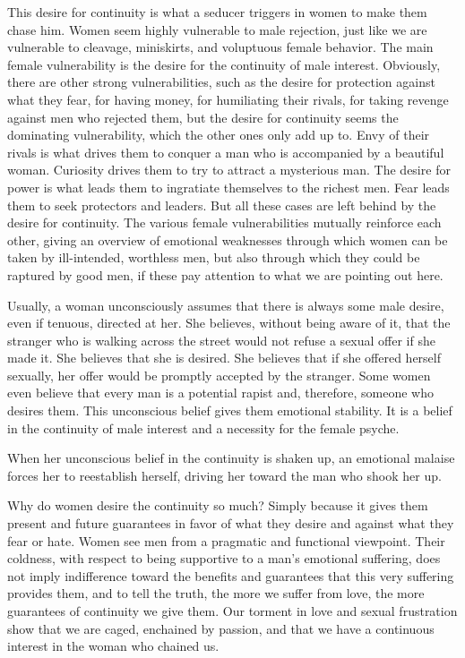 \par This desire for continuity is what a seducer triggers in women to make them chase him. Women seem highly vulnerable to male rejection, just like we are vulnerable to cleavage, miniskirts, and voluptuous female behavior. The main female vulnerability is the desire for the continuity of male interest. Obviously, there are other strong vulnerabilities, such as the desire for protection against what they fear, for having money, for humiliating their rivals, for taking revenge against men who rejected them, but the desire for continuity seems the dominating vulnerability, which the other ones only add up to. Envy of their rivals is what drives them to conquer a man who is accompanied by a beautiful woman. Curiosity drives them to try to attract a mysterious man. The desire for power is what leads them to ingratiate themselves to the richest men. Fear leads them to seek protectors and leaders. But all these cases are left behind by the desire for continuity. The various female vulnerabilities mutually reinforce each other, giving an overview of emotional weaknesses through which women can be taken by ill-intended, worthless men, but also through which they could be raptured by good men, if these pay attention to what we are pointing out here.

\par Usually, a woman unconsciously assumes that there is always some male desire, even if tenuous, directed at her. She believes, without being aware of it, that the stranger who is walking across the street would not refuse a sexual offer if she made it. She believes that she is desired. She believes that if she offered herself sexually, her offer would be promptly accepted by the stranger. Some women even believe that every man is a potential rapist and, therefore, someone who desires them. This unconscious belief gives them emotional stability. It is a belief in the continuity of male interest and a necessity for the female psyche.

\par When her unconscious belief in the continuity is shaken up, an emotional malaise forces her to reestablish herself, driving her toward the man who shook her up.

\par Why do women desire the continuity so much? Simply because it gives them present and future guarantees in favor of what they desire and against what they fear or hate. Women see men from a pragmatic and functional viewpoint. Their coldness, with respect to being supportive to a man's emotional suffering, does not imply indifference toward the benefits and guarantees that this very suffering provides them, and to tell the truth, the more we suffer from love, the more guarantees of continuity we give them. Our torment in love and sexual frustration show that we are caged, enchained by passion, and that we have a continuous interest in the woman who chained us.